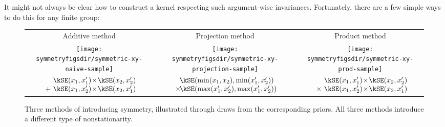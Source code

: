 It might not always be clear how to construct a kernel respecting such argument-wise invariances.
Fortunately, there are a few simple ways to do this for any finite group:
%
%
\begin{figure}
\renewcommand{\tabcolsep}{1.5mm}
\begin{tabular}{ccc}
Additive method & Projection method & Product method \\[0.5ex]
\texttt{[image: \\symmetryfigsdir/symmetric-xy-naive-sample]} &
\texttt{[image: \\symmetryfigsdir/symmetric-xy-projection-sample]} &
\texttt{[image: \\symmetryfigsdir/symmetric-xy-prod-sample]}\\
$\begin{array}{r@{}l@{}}
& \kSE(x_1, x_1')\kerntimes \kSE(x_2, x_2') \\ + \,\, & \kSE(x_1, x_2')\kerntimes\kSE(x_2, x_1')
\end{array}$
&
$\begin{array}{r@{}l@{}}
&            \kSE( \min(x_1, x_2),   \min(x_1', x_2')) \\
\kerntimes & \kSE( \max(x_1', x_2'), \max(x_1',x_2') )
\end{array}$
&
$\begin{array}{r@{}l@{}}
& \kSE(x_1, x_1')\kerntimes \kSE( x_2, x_2') \\ \times \,\, & \kSE(x_1, x_2')\kerntimes \kSE(x_2, x_1')
\end{array}$
\end{tabular}
\caption[Three ways to introduce symmetry]{Three methods of introducing symmetry, illustrated through draws from the corresponding priors.
All three methods introduce a different type of nonstationarity.
}
\label{fig:add_vs_min}
\end{figure}
